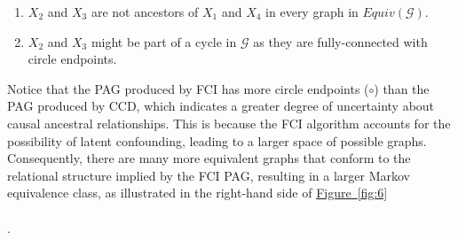 \documentclass[twoside, 11pt]{article}
\newcommand{\starstar}{%
\begin{tikzpicture}[baseline=-3pt]
    \draw [{Rays[n=6]}-{Rays[n=6]}] (0,0) -- (0.55,0);
\end{tikzpicture}
}
\newcommand{\stararrow}{%
\begin{tikzpicture}
    \draw [{Rays[n=6]}-{Straight Barb[length=2.5pt]}] (0,0) -- (0.5, 0);
\end{tikzpicture}
}
\newcommand{\arrowstar}{%
\begin{tikzpicture}
    \draw [{Straight Barb[length=2.5pt]}-{Rays[n=6]}] (0,0) -- (0.5, 0);
\end{tikzpicture}
}
\newcommand*{\figref}[2][]{%
  \hyperref[{fig:#2}]{%
    Figure~\ref*{fig:#2}%
    \ifx\\#1\\%
    \else
      #1%
    \fi
  }%
}
\begin{document}
\begin{enumerate}[nolistsep]
    \item $X_2$ and $X_3$ are not ancestors of $X_1$ and $X_4$ in every graph in $Equiv(\mathcal{G})$.
    \item $X_2$ and $X_3$ might be part of a cycle in $\mathcal{G}$ as they are fully-connected with circle endpoints.
\end{enumerate}

 \noindent Notice that the PAG produced by FCI has more circle endpoints ($\circ$) than the PAG produced by CCD, which indicates a greater degree of uncertainty about causal ancestral relationships. This is because the FCI algorithm accounts for the possibility of latent confounding, leading to a larger space of possible graphs. Consequently, there are many more equivalent graphs that conform to the relational structure implied by the FCI PAG, resulting in a larger Markov equivalence class, as illustrated in the right-hand side of \figref[]{6}.





\end{document}
